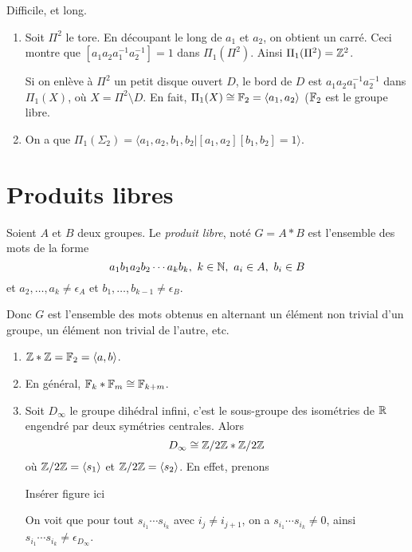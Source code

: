     \begin{preuve}
      Difficile, et long.
    \end{preuve}

    \begin{exs}
      \begin{enumerate}
      \item Soit $\Pi^2$ le tore. En découpant le long de $a_1$ et $a_2$, on obtient un carré. Ceci montre que
        $[a_1a_2a_1^{-1}a_2^{-1}] = 1$ dans $\Pi_1(\Pi^2)$. Ainsi $\Pi_1(\Pi^2) = \mathbb{Z}^2$.

        Si on enlève à $\Pi^2$ un petit disque ouvert $D$, le bord de $D$ est $a_1a_2a_1^{-1}a_2^{-1}$ dans
        $\Pi_1(X)$, où $X = \Pi^2 \setminus D$. En fait, $\Pi_1(X) \cong \mathbb{F}_2 = \langle a_1, a_2 \rangle$
        ($\mathbb{F}_2$ est le groupe libre. 

      \item On a que $\Pi_1(\Sigma_2) = \langle a_1, a_2, b_1, b_2 | [a_1, a_2][b_1, b_2] = 1 \rangle$.
      \end{enumerate}
    \end{exs}

  \section{Produits libres}
  \label{sec:produits-libres}

  \begin{defi} 
    Soient $A$ et $B$ deux groupes. Le \emph{produit libre}, noté $G = A \ast B$ est l'ensemble des mots de la
    forme
      \[a_1b_1a_2b_2 \cdots a_kb_k,\ k \in \mathbb{N},\ a_i \in A,\ b_i \in B\]
    et $a_2, \ldots, a_k \neq \epsilon_A$ et $b_1, \ldots, b_{k-1} \neq \epsilon_B$. 
  \end{defi}

  Donc $G$ est l'ensemble des mots obtenus en alternant un élément non trivial d'un groupe, un élément non
  trivial de l'autre, etc.

  \begin{ex}
    \begin{enumerate}
    \item $\mathbb{Z} \ast \mathbb{Z} = \mathbb{F}_2 = \langle a, b \rangle$.

    \item En général, $\mathbb{F}_k \ast \mathbb{F}_m \cong \mathbb{F}_{k+m}$.

    \item Soit $D_\infty$ le groupe dihédral infini, c'est le sous-groupe des isométries de $\mathbb{R}$ engendré par
      deux symétries centrales. Alors
        \[D_\infty \cong \mathbb{Z}/2\mathbb{Z} \ast \mathbb{Z}/2\mathbb{Z}\]
      où $\mathbb{Z}/2\mathbb{Z} = \langle s_1 \rangle$ et $\mathbb{Z}/2\mathbb{Z} = \langle s_2 \rangle$. En effet, prenons
      \begin{center}
        Insérer figure ici
      \end{center}
      On voit que pour tout $s_{i_1} \cdots s_{i_k}$ avec $i_j \neq i_{j+1}$, on a $s_{i_1} \cdots s_{i_k}
      \neq 0$, ainsi $s_{i_1} \cdots s_{i_k} \neq \epsilon_{D_\infty}$.
    \end{enumerate}
  \end{ex}

